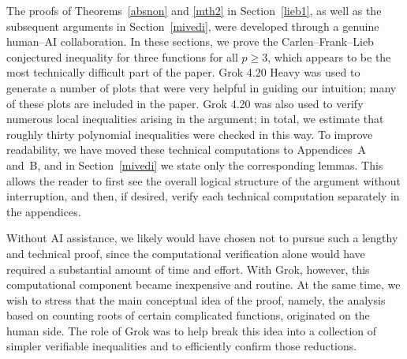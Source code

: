 \documentclass[11pt]{article}
\theoremstyle{definition}
\newcommand{\1}{\mathbf{1}}
\begin{document}
The proofs of Theorems~\ref{absnon} and \ref{mth2} in Section~\ref{lieb1}, as well as the subsequent arguments in Section~\ref{mivedi}, were developed through a genuine human--AI collaboration. In these sections, we prove the Carlen--Frank--Lieb conjectured inequality for three functions for all $p \geq 3$, which appears to be the most technically difficult part of the paper. Grok 4.20 Heavy was used to generate a number of plots that were very helpful in guiding our intuition; many of these plots are included in the paper. Grok 4.20  was also used to verify numerous local inequalities arising in the argument; in total, we estimate that roughly thirty polynomial inequalities were checked in this way. To improve readability, we have moved these technical computations to Appendices~A and~B, and in Section~\ref{mivedi} we state only the corresponding lemmas. This allows the reader to first see the overall logical structure of the argument without interruption, and then, if desired, verify each technical computation separately in the appendices.

Without AI assistance, we likely would have chosen not to pursue such a lengthy and technical proof, since the computational verification alone would have required a substantial amount of time and effort. With Grok, however, this computational component became inexpensive and routine. At the same time, we wish to stress that the main conceptual idea of the proof, namely, the analysis based on counting roots of certain complicated functions, originated on the human side. The role of Grok was to help break this idea into a collection of simpler verifiable inequalities and to efficiently confirm those reductions.


















\end{document}
